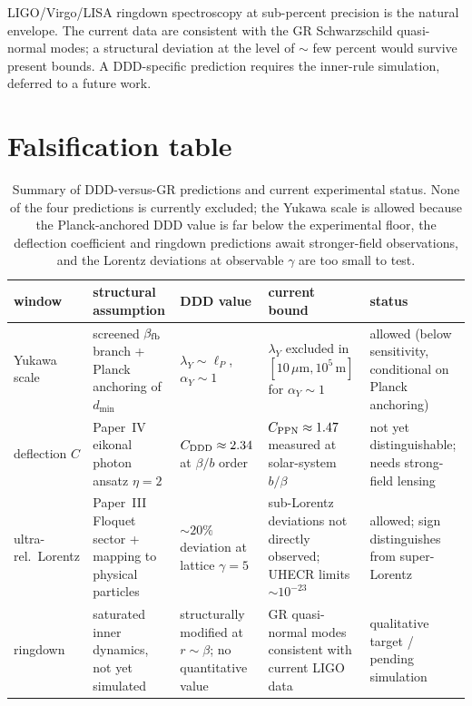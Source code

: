 \documentclass[11pt,a4paper]{article}
\begin{document}
LIGO/Virgo/LISA ringdown spectroscopy at sub-percent precision is the
natural envelope. The current data \cite{ligo_gw150914_ringdown}
are consistent with the GR Schwarzschild quasi-normal modes; a structural deviation
at the level of $\sim$ few percent would survive present bounds. A
DDD-specific prediction requires the inner-rule simulation,
deferred to a future work.

\section{Falsification table}
\label{sec:falsification}

\begin{table}[h]
\centering
\footnotesize
\begin{tabular}{p{}p{}p{}p{}p{}}
\toprule
window & structural assumption & DDD value & current bound & status\\
\midrule
Yukawa scale &
screened $\beta_{\rm fb}$ branch + Planck anchoring of $d_{\min}$ &
$\lambda_Y \sim \ell_P$, $\alpha_Y \sim 1$ &
$\lambda_Y$ excluded in $[10\,\mu\text{m}, 10^5\,\text{m}]$ for $\alpha_Y \sim 1$ \cite{kapner2007} &
allowed (below sensitivity, conditional on Planck anchoring)\\
\addlinespace
deflection $C$ &
Paper~IV eikonal photon ansatz $\eta = 2$ &
$C_{\rm DDD} \approx 2.34$ at $\beta/b$ order &
$C_{\rm PPN} \approx 1.47$ measured at solar-system $b/\beta$ \cite{will2014} &
not yet distinguishable; needs strong-field lensing\\
\addlinespace
ultra-rel.\ Lorentz &
Paper~III Floquet sector + mapping to physical particles &
$\sim 20\%$ deviation at lattice $\gamma = 5$ &
sub-Lorentz deviations not directly observed; UHECR limits $\sim 10^{-23}$ \cite{stecker2014} &
allowed; sign distinguishes from super-Lorentz\\
\addlinespace
ringdown &
saturated inner dynamics, not yet simulated &
structurally modified at $r \sim \beta$; no quantitative value &
GR quasi-normal modes consistent with current LIGO data \cite{ligo_gw150914_ringdown,berti2006} &
qualitative target / pending simulation\\
\bottomrule
\end{tabular}
\caption{Summary of DDD-versus-GR predictions and current
experimental status. None of the four predictions is currently
excluded; the Yukawa scale is allowed because the Planck-anchored
DDD value is far below the experimental floor, the deflection
coefficient and ringdown predictions await stronger-field
observations, and the Lorentz deviations at observable $\gamma$ are
too small to test.}
\label{tab:falsifiers}
\end{table}
\end{document}
